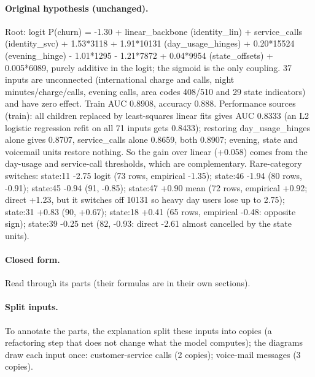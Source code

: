 \documentclass[a4paper,10pt]{article}
\newif\ifreviewmarks
\newcommand{\reviewrule}{\noindent{\color{BrickRed}\rule{\linewidth}{0.8pt}}}
\newenvironment{drafted}[1][]{%
  \ifreviewmarks\par\addvspace{\medskipamount}\reviewrule\par\nopagebreak
  \noindent{\color{BrickRed}\sffamily\footnotesize\textbf{Thesis Draft}\quad #1\hfill review}\par\nopagebreak\smallskip\fi}{%
  \ifreviewmarks\par\smallskip\noindent{\color{BrickRed}\sffamily\footnotesize end of thesis draft}\par\nopagebreak\reviewrule\par\medskip\fi}
\begin{document}
\begin{drafted}[plain-language layer: churn100-s4-c2]
\paragraph{Original hypothesis (unchanged).} Root: logit P(churn) = -1.30 + linear\_\allowbreak{}backbone (identity\_\allowbreak{}lin) + service\_\allowbreak{}calls (identity\_\allowbreak{}svc) + 1.53*3118 + 1.91*10131 (day\_\allowbreak{}usage\_\allowbreak{}hinges) + 0.20*15524 (evening\_\allowbreak{}hinge) - 1.01*1295 - 1.21*7872 + 0.04*9954 (state\_\allowbreak{}offsets) + 0.005*6089, purely additive in the logit; the sigmoid is the only coupling. 37 inputs are unconnected (international charge and calls, night minutes/\allowbreak{}charge/\allowbreak{}calls,\allowbreak{} evening calls, area codes 408/510 and 29 state indicators) and have zero effect. Train AUC 0.8908, accuracy 0.888. Performance sources (train): all children replaced by least-squares linear fits gives AUC 0.8333 (an L2 logistic regression refit on all 71 inputs gets 0.8433); restoring day\_\allowbreak{}usage\_\allowbreak{}hinges alone gives 0.8707, service\_\allowbreak{}calls alone 0.8659, both 0.8907; evening, state and voicemail units restore nothing. So the gain over linear (+0.058) comes from the day-usage and service-call thresholds, which are complementary. Rare-category switches: state:11 -2.75 logit (73 rows, empirical -1.35); state:46 -1.94 (80 rows, -0.91); state:45 -0.94 (91, -0.85); state:47 +0.90 mean (72 rows, empirical +0.92; direct +1.23, but it switches off 10131 so heavy day users lose up to 2.75); state:31 +0.83 (90, +0.67); state:18 +0.41 (65 rows, empirical -0.48: opposite sign); state:39 -0.25 net (82, -0.93: direct -2.61 almost cancelled by the state units).
\paragraph{Closed form.} Read through its parts (their formulas are in their own sections).
\paragraph{Split inputs.} To annotate the parts, the explanation split these inputs into copies (a refactoring step that does not change what the model computes); the diagrams draw each input once: customer-service calls (2 copies); voice-mail messages (3 copies).

\end{drafted}
\end{document}
